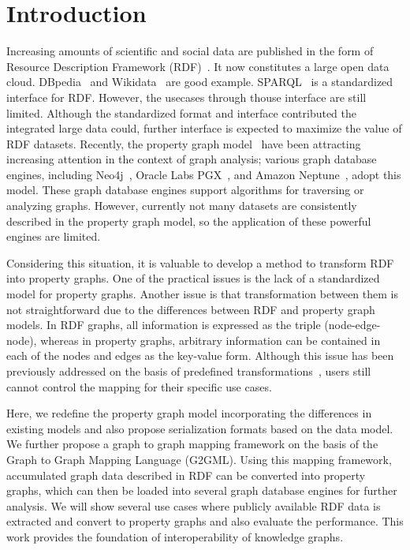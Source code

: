\documentclass[runningheads]{llncs}
\begin{document}
\section{Introduction}

Increasing amounts of scientific and social data are published in the form of Resource Description Framework (RDF)~\cite{rdf}. It now constitutes a large open data cloud. DBpedia~\cite{dbpedia} and Wikidata~\cite{wikidata} are good example. SPARQL~\cite{sparql} is a standardized interface for RDF. However, the usecases through thouse interface are still limited. Although the standardized format and interface contributed the integrated large data could, further interface is expected to maximize the value of RDF datasets. 
Recently, the property graph model~\cite{angles1,angles2} have been attracting increasing attention in the context of graph analysis; various graph database engines, including Neo4j~\cite{neo4j}, Oracle Labs PGX~\cite{pgx}, and Amazon Neptune~\cite{neptune}, adopt this model. These graph database engines support algorithms for traversing or analyzing graphs. However, currently not many datasets are consistently described in the property graph model, so the application of these powerful engines are limited.

Considering this situation, it is valuable to develop a method to transform RDF into property graphs. One of the practical issues is the lack of a standardized model for property graphs. 
Another issue is that transformation between them is not straightforward due to the differences between RDF and property graph models. 
In RDF graphs, all information is expressed as the triple (node-edge-node), whereas in property graphs, arbitrary information can be contained in each of the nodes and edges as the key-value form. 
Although this issue has been previously addressed on the basis of predefined transformations~\cite{hartig},
users still cannot control the mapping for their specific use cases.

Here, we redefine the property graph model incorporating the differences in existing models and also propose serialization formats based on the data model. We further propose a graph to graph mapping framework on the basis of the Graph to Graph Mapping Language (G2GML). Using this mapping framework, accumulated graph data described in RDF can be converted into property graphs, which can then be loaded into several graph database engines for further analysis. We will show several use cases where publicly available RDF data is extracted and convert to property graphs and also evaluate the performance. This work provides the foundation of interoperability of knowledge graphs.
\end{document}
